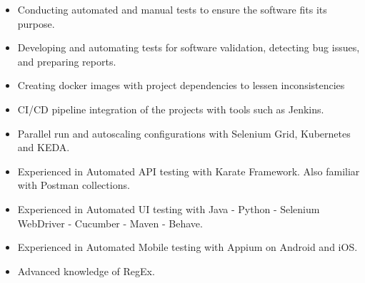 \documentclass[10pt,a4paper]{altacv}
\begin{document}

\begin{fullwidth}
\makecvheader
\end{fullwidth}


\begin{itemize}
\item Conducting automated and manual tests to ensure the software fits its purpose.
\item Developing and automating tests for software validation, detecting bug issues, and preparing reports. 
\item Creating docker images with project dependencies to lessen inconsistencies
\item CI/CD pipeline integration of the projects with tools such as Jenkins.
\item Parallel run and autoscaling configurations with Selenium Grid, Kubernetes and KEDA.
\item Experienced in Automated API testing with Karate Framework. Also familiar with Postman collections.
\item Experienced in Automated UI testing with Java - Python - Selenium WebDriver - Cucumber - Maven - Behave.
\item Experienced in Automated Mobile testing with Appium on Android and iOS.
\item Advanced knowledge of RegEx.

\end{itemize}



\end{document}
